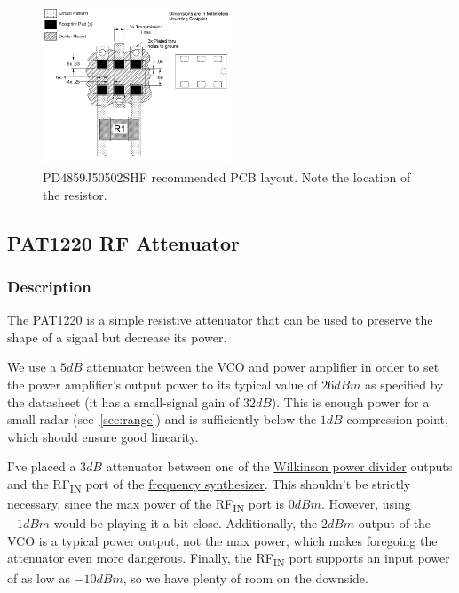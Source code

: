 \begin{figure}[h]
        \centering
        \includegraphics[width=0.5\textwidth]{data/pd4859j50502shf-pcb}
        \caption{PD4859J50502SHF recommended PCB layout. Note the location of the resistor.}
        \label{fig:pd4859j50502shf-pcb}
\end{figure}

\subsection{PAT1220 RF Attenuator}
\label{sec:pat1220}

\subsubsection{Description}
\label{sec:pat1220-description}

The PAT1220 is a simple resistive attenuator that can be used to preserve the shape of a signal but
decrease its power.

We use a $5 \si{dB}$ attenuator between the \hyperref[sec:hmc431lp4rf]{VCO} and
\hyperref[sec:se2567l]{power amplifier} in order to set the power amplifier's output power to its
typical value of $26 \si{dBm}$ as specified by the datasheet (it has a small-signal gain of
$32 \si{dB}$). This is enough power for a small radar (see~\cref{sec:range}) and is sufficiently
below the $1 \si{dB}$ compression point, which should ensure good linearity.

I've placed a $3 \si{dB}$ attenuator between one of the \hyperref[sec:pd4859j5050s2hf]{Wilkinson
  power divider} outputs and the RF\textsubscript{IN} port of the \hyperref[sec:adf4158]{frequency
  synthesizer}. This shouldn't be strictly necessary, since the max power of the
RF\textsubscript{IN} port is $0 \si{dBm}$. However, using $-1 \si{dBm}$ would be playing it a bit
close. Additionally, the $2 \si{dBm}$ output of the VCO is a typical power output, not the max
power, which makes foregoing the attenuator even more dangerous. Finally, the RF\textsubscript{IN}
port supports an input power of as low as $-10 \si{dBm}$, so we have plenty of room on the downside.

